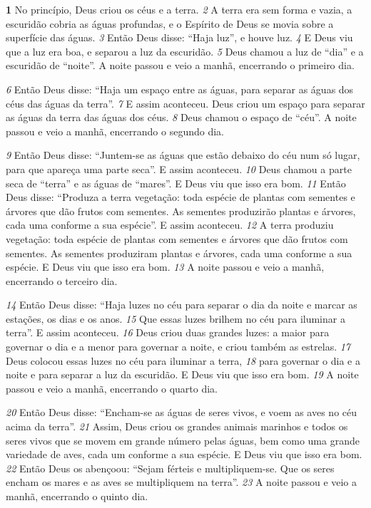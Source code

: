 \textbf{\large 1} 
No princípio, Deus criou os céus e a terra. 
\textit{\tiny 2} 
A   terra era sem forma e vazia, a
escuridão cobria as águas profundas, e o Espírito de Deus se movia sobre a superfície das águas. 
\textit{\tiny 3} 
Então Deus disse: “Haja luz”, e houve luz. 
\textit{\tiny 4} 
E Deus viu que a luz era boa, e separou a luz da escuridão. 
\textit{\tiny 5} Deus chamou a luz de “dia” e a escuridão de “noite”. A noite passou e veio a manhã, encerrando o primeiro dia.

\bigskip
\textit{\tiny 6} Então Deus disse: “Haja um espaço entre as águas, para separar as águas dos céus das águas da terra”. 
\textit{\tiny 7} 
E assim aconteceu. Deus criou um espaço para separar as águas da terra das águas dos céus. 
\textit{\tiny 8} 
Deus chamou o espaço de “céu”. A noite passou e veio a manhã, encerrando o segundo dia.

\bigskip
\textit{\tiny 9} 
Então     Deus disse: “Juntem-se as águas que estão debaixo do céu num só lugar, para que apareça uma parte seca”. E assim aconteceu. 
\textit{\tiny 10} 
Deus chamou a parte seca de “terra” e as águas de “mares”. E Deus viu que isso era bom. 
\textit{\tiny 11} 
Então Deus disse: “Produza a terra vegetação: toda espécie de plantas com sementes e árvores que dão frutos com sementes. As sementes produzirão plantas e árvores, cada uma conforme a sua espécie”. E assim aconteceu.
\textit{\tiny 12} 
A terra produziu vegetação: toda espécie de plantas com sementes e árvores que dão frutos com sementes. As sementes produziram plantas e árvores, cada uma conforme a sua espécie. E Deus viu que isso era bom.      
\textit{\tiny 13}
A noite passou e veio a manhã, encerrando o terceiro dia.

\bigskip
\textit{\tiny 14}
Então  Deus disse: “Haja luzes no céu para separar o dia da noite e marcar as estações, os dias e os anos. 
\textit{\tiny 15}
Que essas luzes brilhem no céu para iluminar a terra”. E assim aconteceu. 
\textit{\tiny 16}
Deus criou duas grandes luzes: a maior para governar o dia e a menor para governar a noite, e criou também as estrelas.
\textit{\tiny 17}
Deus colocou essas luzes no céu para iluminar a terra,
\textit{\tiny 18} 
para governar o dia e a noite e para separar a luz da escuridão. E Deus viu que isso era bom.
\textit{\tiny 19}
A noite passou e veio a manhã, encerrando o quarto dia.

\bigskip
\textit{\tiny 20}
Então Deus disse: “Encham-se as águas de seres vivos, e voem as aves no céu acima da terra”. 
\textit{\tiny 21}
Assim, Deus criou os grandes animais marinhos e todos os seres vivos que se movem em grande número pelas águas, bem como uma grande variedade de aves, cada um conforme a sua espécie. E Deus viu que isso era bom. 
\textit{\tiny 22}
Então Deus os abençoou: “Sejam férteis e multipliquem-se. Que os seres encham os mares e as aves se multipliquem na terra”.
\textit{\tiny 23}
A noite passou e veio a manhã, encerrando o quinto dia.

